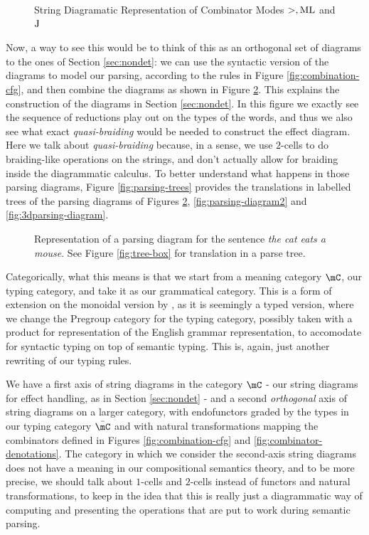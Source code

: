 \begin{figure}
	\centering
	\caption{String Diagramatic Representation of Combinator Modes $>, \text{ML}$ and $\text{J}$}
	\label{fig:combinator-sd}
\end{figure}

Now, a way to see this would be to think of this as an orthogonal set of
diagrams to the ones of Section \ref{sec:nondet}: we can use the syntactic
version of the diagrams to model our parsing, according to the rules in
Figure \ref{fig:combination-cfg}, and then combine the diagrams as shown in
Figure \ref{fig:parsing-diagram}.
This explains the construction of the diagrams in Section \ref{sec:nondet}.
In this figure we exactly see the sequence of reductions play out on the types
of the words, and thus we also see what exact \emph{quasi-braiding} would be
needed to construct the effect diagram.
Here we talk about \emph{quasi-braiding} because, in a sense, we use $2$-cells
to do braiding-like operations on the strings, and don't actually allow for
braiding inside the diagrammatic calculus.
To better understand what happens in those parsing diagrams, Figure
\ref{fig:parsing-trees} provides the translations in labelled trees of the
parsing diagrams of Figures \ref{fig:parsing-diagram},
\ref{fig:parsing-diagram2} and \ref{fig:3dparsing-diagram}.


\begin{figure}
	\centering
	\caption{Representation of a parsing diagram for the sentence
		\emph{the cat eats a mouse}.
		See Figure \ref{fig:tree-box} for translation in a parse tree.}
	\label{fig:parsing-diagram}
\end{figure}

Categorically, what this means is that we start from a meaning category $\mC$,
our typing category, and take it as our grammatical category.
This is a form of extension on the monoidal version by
\cite{coeckeMathematicalFoundationsCompositional2010}, as it is seemingly a
typed version, where we change the Pregroup category for the typing category,
possibly taken with a product for representation of the English grammar
representation, to accomodate for syntactic typing on top of semantic typing.
This is, again, just another rewriting of our typing rules.

We have a first axis of string diagrams in the category
$\mC$ - our string diagrams for effect handling, as in Section
\ref{sec:nondet} - and a second \emph{orthogonal} axis of string diagrams
on a larger category, with endofunctors graded by the types in our typing
category $\bar{\mC}$ and with natural transformations mapping the combinators
defined in Figures \ref{fig:combination-cfg} and
\ref{fig:combinator-denotations}.
The category in which we consider the second-axis string diagrams does not have
a meaning in our compositional semantics theory, and to be more precise, we
should talk about $1$-cells and $2$-cells instead of functors and natural
transformations, to keep in the idea that this is really just a diagrammatic
way of computing and presenting the operations that are put to work during
semantic parsing.

